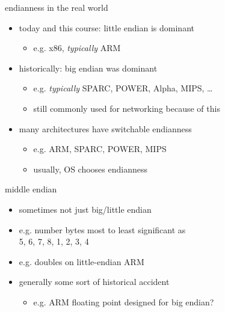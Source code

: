 \begin{frame}{endianness in the real world}
\begin{itemize}
\item today and this course: little endian is dominant
    \begin{itemize}
    \item e.g. x86, \textit{typically} ARM
    \end{itemize}
\item historically: big endian was dominant
    \begin{itemize}
    \item e.g. \textit{typically} SPARC, POWER, Alpha, MIPS, \ldots
    \item still commonly used for networking because of this
    \end{itemize}
\item many architectures have switchable endianness
    \begin{itemize}
    \item e.g. ARM, SPARC, POWER, MIPS
    \item usually, OS chooses endianness
    \end{itemize}
\end{itemize}
\end{frame}

\begin{frame}{middle endian}
\begin{itemize}
\item sometimes not just big/little endian
\item e.g. number bytes most to least significant as \\
    5, 6, 7, 8, 1, 2, 3, 4
\item e.g. doubles on little-endian ARM
\item generally some sort of historical accident
    \begin{itemize}
    \item e.g. ARM floating point designed for big endian?
    \end{itemize}
\end{itemize}
\end{frame}

